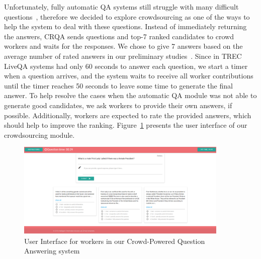 \documentclass[letterpaper]{article}
\begin{document}
Unfortunately, fully automatic QA systems still struggle with many difficult questions~\cite{overviewliveqa15}, therefore we decided to explore crowdsourcing as one of the ways to help the system to deal with these questions.
Instead of immediately returning the answers, CRQA sends questions and top-7 ranked candidates to crowd workers and waits for the responses.
We chose to give 7 answers based on the average number of rated answers in our preliminary studies~\cite{savenkov_crowdsourcing2016a}.
Since in TREC LiveQA systems had only 60 seconds to answer each question, we start a timer when a question arrives, and the system waits to receive all worker contributions until the timer reaches 50 seconds to leave some time to generate the final answer.
To help resolve the cases when the automatic QA module was not able to generate good candidates, we ask workers to provide their own answers, if possible.
Additionally, workers are expected to rate the provided answers, which should help to improve the ranking.
Figure~\ref{fig:crowd_ui} presents the user interface of our crowdsourcing module.

\begin{figure}[h!t]
	\centering
	\includegraphics[width=0.9\textwidth]{img/crowd_ui}
	\caption{User Interface for workers in our Crowd-Powered Question Answering system}
	\label{fig:crowd_ui}
\end{figure}
\end{document}
